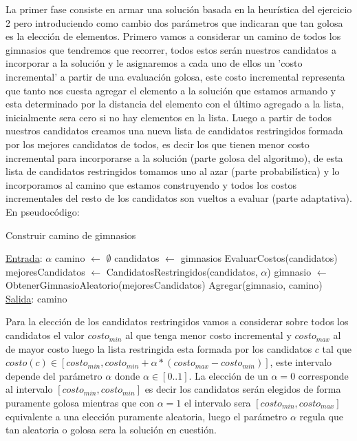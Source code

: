La primer fase consiste en armar una solución basada en la heurística del ejercicio 2 pero introduciendo como cambio dos parámetros que indicaran que tan golosa es la elección de elementos. Primero vamos a considerar un camino de todos los gimnasios que tendremos que recorrer, todos estos serán nuestros candidatos a incorporar a la solución y le asignaremos a cada uno de ellos un 'costo incremental' a partir de una evaluación golosa, este costo incremental representa que tanto nos cuesta agregar el elemento a la solución que estamos armando y esta determinado por la distancia del elemento con el último agregado a la lista, inicialmente sera cero si no hay elementos en la lista. Luego a partir de todos nuestros candidatos creamos una nueva lista de candidatos restringidos formada por los mejores candidatos de todos, es decir los que tienen menor costo incremental para incorporarse a la solución (parte golosa del algoritmo), de esta lista de candidatos restringidos tomamos uno al azar (parte probabilística) y lo incorporamos al camino que estamos construyendo y todos los costos incrementales del resto de los candidatos son vueltos a evaluar (parte adaptativa). En pseudocódigo:

\begin{algorithm}[H]

\label{}
\caption{Construir camino de gimnasios}

\begin{algorithmic}[1]

\Statex \underline{Entrada}: $\alpha$
\medskip
\State camino $\gets$ $\emptyset$
\State candidatos $\gets$ gimnasios
    \State EvaluarCostos(candidatos)
	\State mejoresCandidatos $\gets$ CandidatosRestringidos(candidatos, $\alpha$)
	\State gimnasio $\gets$ ObtenerGimnasioAleatorio(mejoresCandidatos)
	\State Agregar(gimnasio, camino)
\EndWhile
\medskip
\Statex \underline{Salida}: camino

\end{algorithmic}
\end{algorithm}

Para la elección de los candidatos restringidos vamos a considerar sobre todos los candidatos el valor $costo_{min}$ al que tenga menor costo incremental y $costo_{max}$ al de mayor costo luego la lista restringida esta formada por los candidatos $c$ tal que $costo(c) \in [costo_{min}, costo_{min} + \alpha * (costo_{max} - costo_{min})]$, este intervalo depende del parámetro $\alpha$ donde $\alpha \in [0..1]$. La elección de un $\alpha = 0$ corresponde al intervalo $[costo_{min}, costo_{min}]$ es decir los candidatos serán elegidos de forma puramente golosa mientras que con $\alpha = 1$ el intervalo sera $[costo_{min}, costo_{max}]$ equivalente a una elección puramente aleatoria, luego el parámetro $\alpha$ regula que tan aleatoria o golosa sera la solución en cuestión.

